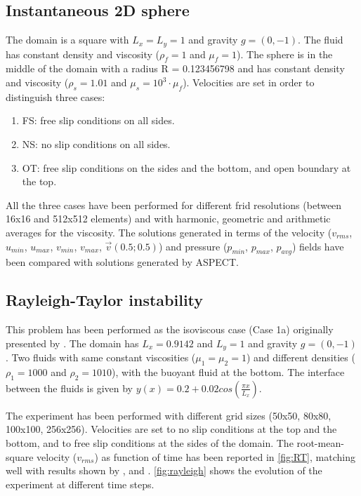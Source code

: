 \documentclass[draft,tec]{agutexSI2019}
\begin{document}
\begin{article}
\subsection{Instantaneous 2D sphere}\label{sec:ist_sphere}
The domain is a square with $L_x=L_y=1$ and gravity $g=(0,-1)$. The fluid has constant density and viscosity ($\rho_f=1$ and $\mu_f=1$). The sphere is in the middle of the domain with a radius R = 0.123456798 and has constant density and viscosity ($\rho_s=1.01$ and $\mu_s=10^3 \cdot \mu_f$).
Velocities are set in order to distinguish three cases:
\begin{enumerate}
\item FS: free slip conditions on all sides.
\item NS: no slip conditions on all sides.
\item OT: free slip conditions on the sides and the bottom, and open boundary at the top.
\end{enumerate}
All the three cases have been performed for different frid resolutions (between 16x16 and 512x512 elements) and with harmonic, geometric and arithmetic averages for the viscosity. The solutions generated in terms of the velocity ($v_{rms}$, $u_{min}$, $u_{max}$, $v_{min}$, $v_{max}$, $\vec{v}(0.5;0.5)$) and pressure ($p_{min}$, $p_{max}$, $p_{avg}$) fields have been compared with solutions generated by ASPECT.

\subsection{Rayleigh-Taylor instability}\label{sec:rayleigh}
This problem has been performed as the isoviscous case (Case 1a) originally presented by . The domain has $L_x=0.9142$ and $L_y=1$ and gravity $g=(0,-1)$. Two fluids with same constant viscosities ($\mu_1=\mu_2=1$) and different densities ($\rho_1=1000$ and $\rho_2=1010$), with the buoyant fluid at the bottom. The interface between the fluids is given by $y(x)=0.2+0.02 cos \left(\frac{\pi x}{L_x}\right)$.

The experiment has been performed with different grid sizes (50x50, 80x80, 100x100, 256x256). Velocities are set to no slip conditions at the top and the bottom, and to free slip conditions at the sides of the domain. The root-mean-square velocity ($v_{rms}$) as function of time has been reported in \ref{fig:RT}, matching well with results shown by ,  and . \ref{fig:rayleigh} shows the evolution of the experiment at different time steps.


\end{article}
\end{document}
